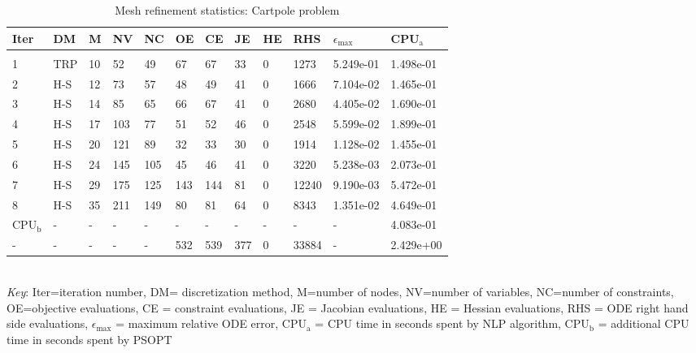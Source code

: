 
\begin{table}
\caption{Mesh refinement statistics: Cartpole problem}
\label{mesh_stats_cartpole}
\renewcommand{\tabcolsep}{0.15cm}
\small
\begin{tabular}{llllllllllll}
Iter&DM&M&NV&NC&OE&CE&JE&HE&RHS&$\epsilon_{\max}$&CPU$_\mathrm{a}$ \\ \hline \\
1&TRP&10&52&49&67&67&33&0&1273&5.249e-01&1.498e-01\\
2&H-S&12&73&57&48&49&41&0&1666&7.104e-02&1.465e-01\\
3&H-S&14&85&65&66&67&41&0&2680&4.405e-02&1.690e-01\\
4&H-S&17&103&77&51&52&46&0&2548&5.599e-02&1.899e-01\\
5&H-S&20&121&89&32&33&30&0&1914&1.128e-02&1.455e-01\\
6&H-S&24&145&105&45&46&41&0&3220&5.238e-03&2.073e-01\\
7&H-S&29&175&125&143&144&81&0&12240&9.190e-03&5.472e-01\\
8&H-S&35&211&149&80&81&64&0&8343&1.351e-02&4.649e-01\\
\hline
CPU$_\mathrm{b}$ &-&-&-&-&-&-&-&-&-&-&4.083e-01\\
-&-&-&-&-&532&539&377&0&33884&-&2.429e+00\\
\end{tabular}
\newline \\ \emph{Key}: Iter=iteration number, DM= discretization method, M=number of nodes, NV=number of variables, NC=number of constraints, OE=objective evaluations,  	              CE = constraint evaluations, JE = Jacobian evaluations, HE = Hessian evaluations, RHS = ODE right hand side 		      evaluations, $\epsilon_{\max}$ = maximum relative ODE error, CPU$_\mathrm{a}$ = CPU time in seconds spent by NLP algorithm, 		      CPU$_\mathrm{b}$ = additional CPU time in seconds spent by PSOPT
\normalsize
\end{table}